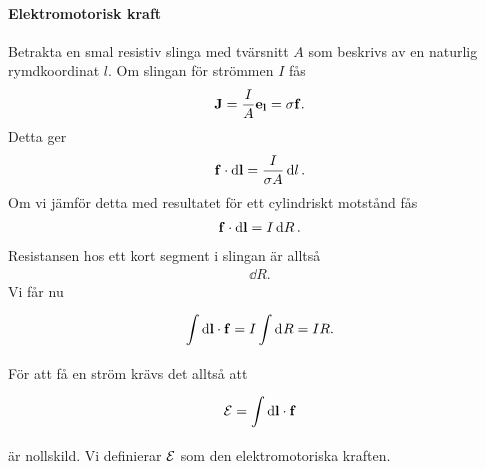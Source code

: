 \paragraph{Elektromotorisk kraft}
Betrakta en smal resistiv slinga med tvärsnitt $A$ som beskrivs av en naturlig rymdkoordinat $l$. Om slingan för strömmen $I$ fås
\begin{align*}
	\vb{J} = \frac{I}{A}\vb{e}_{\vb{l}} = \sigma\vb{f}.
\end{align*}
Detta ger
\begin{align*}
	\vb{f}\cdot\dd{\vb{l}} = \frac{I}{\sigma A}\dd{l}.
\end{align*}
Om vi jämför detta med resultatet för ett cylindriskt motstånd fås
\begin{align*}
	\vb{f}\cdot\dd{\vb{l}} = I\dd{R}.
\end{align*}
Resistansen hos ett kort segment i slingan är alltså
\begin{align*}
	\dd{R}.
\end{align*}
Vi får nu
\begin{align*}
	\int\limits_{}^{}\dd{\vb{l}}\cdot \vb{f} = I\int\limits_{}^{}\dd[]{R} = IR.
\end{align*}
För att få en ström krävs det alltså att
\begin{align*}
	\mathcal{E} = \int\limits_{}^{}\dd{\vb{l}}\cdot \vb{f}
\end{align*}
är nollskild. Vi definierar $\mathcal{E}$ som den elektromotoriska kraften.